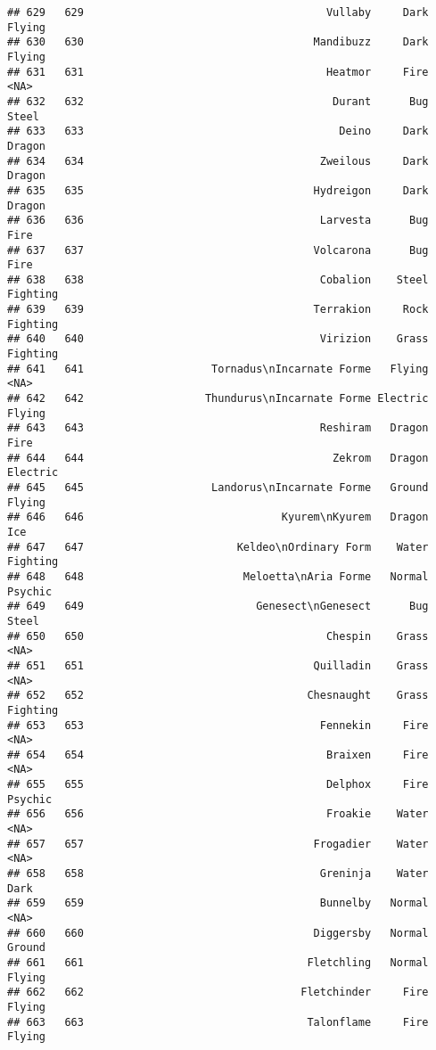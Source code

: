 \documentclass[
]{article}
\begin{document}
\begin{verbatim}
## 629   629                                      Vullaby     Dark   Flying
## 630   630                                    Mandibuzz     Dark   Flying
## 631   631                                      Heatmor     Fire     <NA>
## 632   632                                       Durant      Bug    Steel
## 633   633                                        Deino     Dark   Dragon
## 634   634                                     Zweilous     Dark   Dragon
## 635   635                                    Hydreigon     Dark   Dragon
## 636   636                                     Larvesta      Bug     Fire
## 637   637                                    Volcarona      Bug     Fire
## 638   638                                     Cobalion    Steel Fighting
## 639   639                                    Terrakion     Rock Fighting
## 640   640                                     Virizion    Grass Fighting
## 641   641                    Tornadus\nIncarnate Forme   Flying     <NA>
## 642   642                   Thundurus\nIncarnate Forme Electric   Flying
## 643   643                                     Reshiram   Dragon     Fire
## 644   644                                       Zekrom   Dragon Electric
## 645   645                    Landorus\nIncarnate Forme   Ground   Flying
## 646   646                               Kyurem\nKyurem   Dragon      Ice
## 647   647                        Keldeo\nOrdinary Form    Water Fighting
## 648   648                         Meloetta\nAria Forme   Normal  Psychic
## 649   649                           Genesect\nGenesect      Bug    Steel
## 650   650                                      Chespin    Grass     <NA>
## 651   651                                    Quilladin    Grass     <NA>
## 652   652                                   Chesnaught    Grass Fighting
## 653   653                                     Fennekin     Fire     <NA>
## 654   654                                      Braixen     Fire     <NA>
## 655   655                                      Delphox     Fire  Psychic
## 656   656                                      Froakie    Water     <NA>
## 657   657                                    Frogadier    Water     <NA>
## 658   658                                     Greninja    Water     Dark
## 659   659                                     Bunnelby   Normal     <NA>
## 660   660                                    Diggersby   Normal   Ground
## 661   661                                   Fletchling   Normal   Flying
## 662   662                                  Fletchinder     Fire   Flying
## 663   663                                   Talonflame     Fire   Flying

\end{verbatim}
\end{document}
